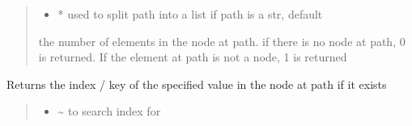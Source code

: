\documentclass[a4paper,10pt,english]{sphinxmanual}
\begin{document}
\begin{fulllineitems}
\begin{fulllineitems}
\begin{quote}
\begin{description}
\begin{itemize}
\item {}
\sphinxAtStartPar
{} \textendash{} * used to split path into a list if path is a str, default 

\end{itemize}

\sphinxAtStartPar
the number of elements in the node at path. if there is no node at path, 0 is returned. If the element
at path is not a node, 1 is returned

\end{description}\end{quote}

\end{fulllineitems}


\begin{fulllineitems}
\label{\detokenize{fagus.fagus:fagus.fagus.Fagus.index}}
\pysigstartsignatures
{}
\pysigstopsignatures
\sphinxAtStartPar
Returns the index / key of the specified value in the node at path if it exists
\begin{quote}\begin{description}
\begin{itemize}
\item {}
\sphinxAtStartPar
{} \textendash{} \textasciitilde{} to search index for


\end{itemize}
\end{description}
\end{quote}
\end{fulllineitems}
\end{fulllineitems}
\end{document}
